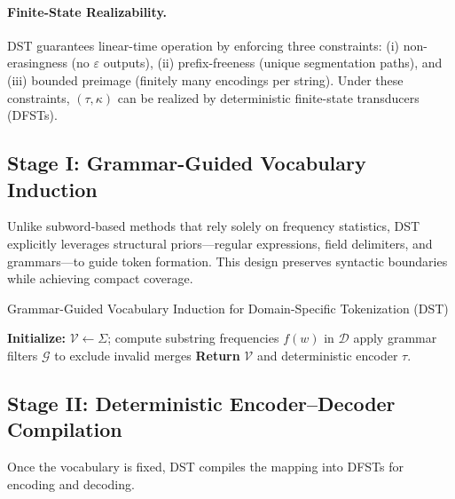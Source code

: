 \paragraph{Finite-State Realizability.}
DST guarantees linear-time operation by enforcing three constraints:
(i) non-erasingness (no $\varepsilon$ outputs),
(ii) prefix-freeness (unique segmentation paths), and
(iii) bounded preimage (finitely many encodings per string).
Under these constraints, $(\tau,\kappa)$ can be realized by deterministic finite-state transducers (DFSTs).


\subsection{Stage I: Grammar-Guided Vocabulary Induction}
Unlike subword-based methods that rely solely on frequency statistics, DST explicitly leverages structural priors—regular expressions, field delimiters, and grammars—to guide token formation.
This design preserves syntactic boundaries while achieving compact coverage.

\begin{algorithm}[t]
\caption{Grammar-Guided Vocabulary Induction for Domain-Specific Tokenization (DST)}
\label{alg:dst_vocab}
\BlankLine
\textbf{Initialize:}
$\mathcal{V} \leftarrow \Sigma$; compute substring frequencies $f(w)$ in $\mathcal{D}$\;
apply grammar filters $\mathcal{G}$ to exclude invalid merges\;
\textbf{Return} $\mathcal{V}$ and deterministic encoder $\tau$.
\end{algorithm}

\subsection{Stage II: Deterministic Encoder–Decoder Compilation}
Once the vocabulary is fixed, DST compiles the mapping into DFSTs for encoding and decoding.

